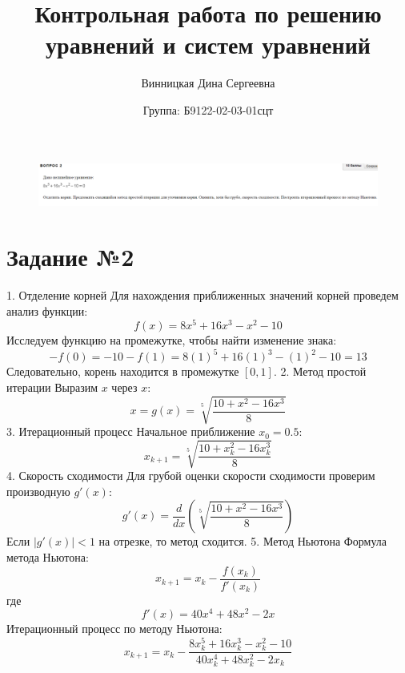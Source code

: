 \documentclass{article}
\title{Контрольная работа по решению уравнений и систем уравнений}
\author{Винницкая Дина Сергеевна}
\date{Группа: Б9122-02-03-01сцт}
\begin{document}
\maketitle
\begin{figure}[H]
    \centering
    \includegraphics[width=1\textwidth]{last-kr-2.png}
    \label{fig:my_label}
\end{figure}
\section*{Задание №2}

1. Отделение корней
Для нахождения приближенных значений корней проведем анализ функции:
\[ f(x) = 8x^5 + 16x^3 - x^2 - 10 \]
Исследуем функцию на промежутке, чтобы найти изменение знака:
\[-  f(0) = -10 
-  f(1) = 8(1)^5 + 16(1)^3 - (1)^2 - 10 = 13 
\]
Следовательно, корень находится в промежутке \([0, 1]\).
2. Метод простой итерации
Выразим \( x \) через \( x \):
\[ x = g(x) = \sqrt[5]{\frac{10 + x^2 - 16x^3}{8}} \]
3. Итерационный процесс
Начальное приближение \( x_0 = 0.5 \):
\[
x_{k+1} = \sqrt[5]{\frac{10 + x_k^2 - 16x_k^3}{8}}
\]
4. Скорость сходимости
Для грубой оценки скорости сходимости проверим производную \( g'(x) \):
\[
g'(x) = \frac{d}{dx}\left(\sqrt[5]{\frac{10 + x^2 - 16x^3}{8}}\right)
\]
Если \(|g'(x)| < 1\) на отрезке, то метод сходится.
5. Метод Ньютона
Формула метода Ньютона:
\[ x_{k+1} = x_k - \frac{f(x_k)}{f'(x_k)} \]
где
\[ f'(x) = 40x^4 + 48x^2 - 2x \]
Итерационный процесс по методу Ньютона:
\[
x_{k+1} = x_k - \frac{8x_k^5 + 16x_k^3 - x_k^2 - 10}{40x_k^4 + 48x_k^2 - 2x_k}
\]
\end{document}
